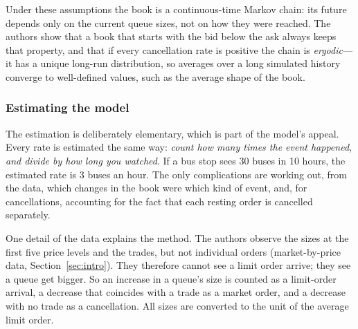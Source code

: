 Under these assumptions the book is a continuous-time Markov chain: its future depends only on the
current queue sizes, not on how they were reached. The authors show that a book that starts with the
bid below the ask always keeps that property, and that if every cancellation rate is positive the
chain is \emph{ergodic}---it has a unique long-run distribution, so averages over a long simulated
history converge to well-defined values, such as the average shape of the book.

\subsubsection{Estimating the model}

The estimation is deliberately elementary, which is part of the model's appeal. Every rate is
estimated the same way: \emph{count how many times the event happened, and divide by how long you
watched}. If a bus stop sees 30 buses in 10 hours, the estimated rate is 3 buses an hour. The only
complications are working out, from the data, which changes in the book were which kind of event, and,
for cancellations, accounting for the fact that each resting order is cancelled separately.

One detail of the data explains the method. The authors observe the sizes at the first five price levels
and the trades, but not individual orders (market-by-price data, Section~\ref{sec:intro}). They therefore
cannot see a limit order arrive; they see a queue get bigger. So an increase in a queue's size is counted
as a limit-order arrival, a decrease that coincides with a trade as a market order, and a decrease with no
trade as a cancellation. All sizes are converted to the unit of the average limit order.

